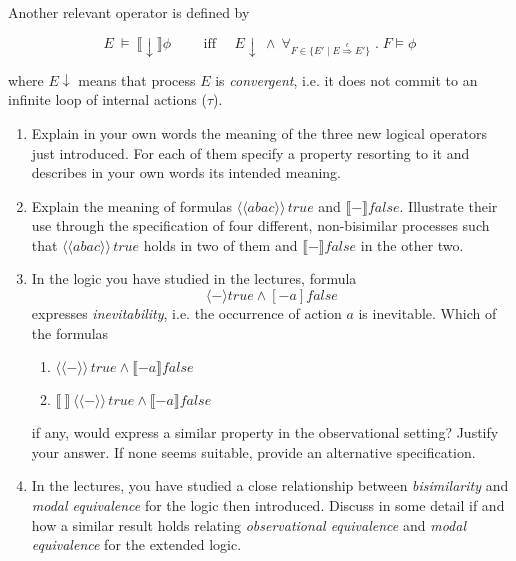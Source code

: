 \documentclass[titlepage,12pt]{article}
\def\rtrano#1{\stackrel{#1}{\Longrightarrow}}
\def\fuc#1{#1}
\def\e{\mathbin{\wedge}}
\def\universal#1#2{\forall_{#1}\;.\; #2}
\def\true{\fuc{true}}
\def\false{\fuc{false}}
\def\pv#1#2{\langle #1 \rangle #2}
\def\nc#1#2{[#1]#2}
\def\pvo#1#2{\langle \! \! \! \langle #1 \rangle \! \! \! \rangle\, #2}
\def\nco#1#2{\llbracket #1 \rrbracket #2}
\def\cvg#1{\llbracket \downarrow \rrbracket #1}
\def\setdef#1#2{\{#1\; |\;#2\}}             %
\begin{document}
Another relevant operator is defined by 

\begin{equation*}
E\:  \models\: \cvg{\phi} \text{~~~~~~ iff ~~~} E \downarrow\: \e\:
\universal{F \in \setdef{E'}{E \rtrano{\epsilon} E'}}{F \models \phi}
\end{equation*}

\noindent
where $E \downarrow$ means that process $E$ is \emph{convergent}, i.e. it does not commit to an infinite loop of 
internal actions ($\tau$).


\begin{enumerate}
\item
Explain in your own words the meaning of the three new logical operators just introduced. For each of them specify a property resorting to it and describes in your own words its intended meaning.
\item
Explain the meaning of formulas $\pvo{abac}{\true}$ and $\nco{-}{\false}$. Illustrate their use through the specification of four different, non-bisimilar processes such that $\pvo{abac}{\true}$ holds in two of them and $\nco{-}{\false}$ in the other two.
\item
In the logic you have studied in the lectures, formula
$$
\pv{-}{\true} \e \nc{-a}{\false}
$$
expresses \emph{inevitability}, i.e. the occurrence of action $a$ is inevitable.
Which of the  formulas
\begin{enumerate}
\item  $\pvo{-}{\true} \e \nco{-a}{\false}$  
\item $\nco{~}{~} \pvo{-}{\true} \e \nco{-a}{\false}$
\end{enumerate}
if any, would express a similar property in the observational setting? 
Justify your answer. If none seems suitable, provide an alternative specification.

\item
In the lectures, you have studied a close relationship between \emph{bisimilarity} and \emph{modal equivalence} for the logic then introduced.
Discuss in some detail if and how a similar result holds relating \emph{observational equivalence} and \emph{modal equivalence} 
for the extended logic.
\end{enumerate}
\end{document}
